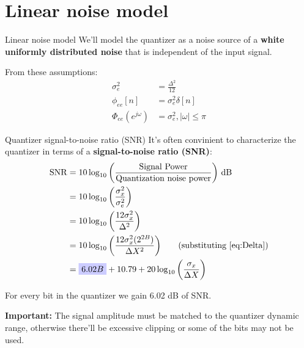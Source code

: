 \documentclass[10pt, aspectratio=169, handout]{beamer}
\begin{document}
%
\section{Linear noise model}
\begin{frame}{Linear noise model}
We'll model the quantizer as a noise source of a \textbf{white uniformly distributed noise} that is independent of the input signal. 

\begin{center}
	\resizebox{0.6\textwidth}{!}{}
\end{center}
\vspace{-0.5cm}
\pause
From these assumptions:
\begin{align*}
\sigma_e^2 &= \frac{\Delta^2}{12} \tag{average power} \\
\phi_{ee}[n] &= \sigma_e^2\delta[n] \tag{autocorrelation function} \\
\Phi_{ee}(e^{j\omega}) &= \sigma_e^2, |\omega| \leq \pi \tag{PSD}
\end{align*}
\end{frame}

%
\begin{frame}{Quantizer signal-to-noise ratio (SNR)}
It's often convinient to characterize the quantizer in terms of a \textbf{signal-to-noise ratio (SNR)}:
\begin{align*}
\mathrm{SNR} &= 10\log_{10}\bigg(\frac{\text{Signal Power}}{\text{Quantization noise power}}\bigg)~\text{dB} \\
&= 10\log_{10}\bigg(\frac{\sigma_x^2}{\sigma_e^2}\bigg) \\
&= 10\log_{10}\bigg(\frac{12\sigma_x^2}{\Delta^2}\bigg) \\
&= 10\log_{10}\bigg(\frac{12\sigma_x^2(2^{2B})}{\Delta X^2}\bigg) \tag{substituting \eqref{eq:Delta}} \\
&= \tikz[baseline]{\node[fill=blue!20,anchor=base] {$6.02B$};} + 10.79  + 20\log_{10}\bigg(\frac{\sigma_x}{\Delta X}\bigg) 
\end{align*}

For every bit in the quantizer we gain 6.02 dB of SNR.

\textbf{Important:} The signal amplitude must be matched to the quantizer dynamic range, otherwise there'll be excessive clipping or some of the bits may not be used. 
\end{frame}
\end{document}
